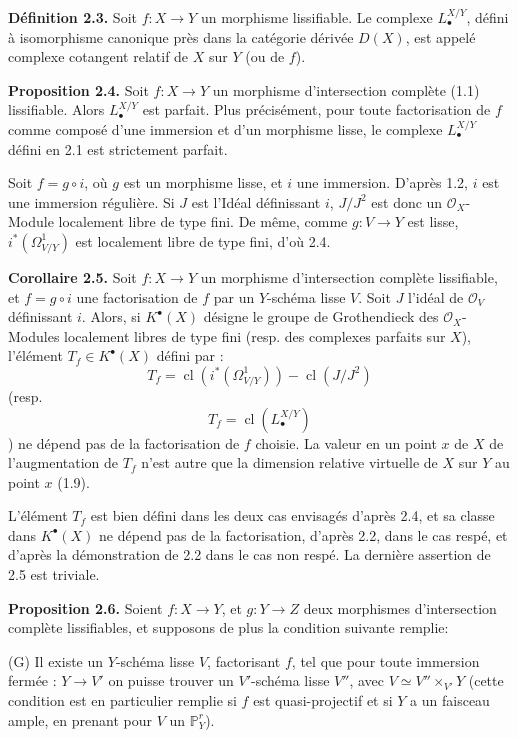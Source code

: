 \documentclass[11pt]{article}
\begin{document}
\textbf{Définition 2.3.} Soit $f:X\to Y$ un morphisme lissifiable. Le complexe $L^{X/Y}_\bullet$, défini à isomorphisme canonique près dans la catégorie dérivée $D(X)$, est appelé complexe cotangent relatif de $X$ sur $Y$ (ou de $f$).

\textbf{Proposition 2.4.} Soit $f:X\to Y$ un morphisme d'intersection complète (1.1) lissifiable. Alors $L^{X/Y}_\bullet$ est parfait. Plus précisément, pour toute
factorisation de $f$ comme composé d'une immersion et d'un morphisme lisse, le complexe $L^{X/Y}_\bullet$ défini en 2.1 est strictement parfait.

Soit $f=g\circ i$, où $g$ est un morphisme lisse, et $i$ une immersion. D'après 1.2, $i$ est une immersion régulière. Si $J$ est l'Idéal définissant $i$, $J/J^2$ est donc un $\mathcal O_X$-Module localement libre de type fini. De même, comme $g:V\to Y$ est lisse, $i^*(\Omega^1_{V/Y})$ est localement libre de type fini, d'où 2.4.

\textbf{Corollaire 2.5.} Soit $f:X\to Y$ un morphisme d'intersection complète lissifiable, et $f=g\circ i$ une factorisation de $f$ par un $Y$-schéma lisse $V$. Soit $J$ l'idéal de $\mathcal O_V$ définissant $i$. Alors, si $K^{\bullet}(X)$ désigne le groupe de Grothendieck des $\mathcal O_X$-Modules localement libres de type fini (resp. des complexes parfaits sur $X$), l'élément $T_f\in K^{\bullet}(X)$ défini par :
\[
T_f=\operatorname{cl}(i^*(\Omega^1_{V/Y}))-\operatorname{cl}(J/J^2)
\]
(resp.
\[
T_f=\operatorname{cl}(L^{X/Y}_\bullet)
\]
)
ne dépend pas de la factorisation de $f$ choisie. La valeur en un point $x$ de $X$ de l'augmentation de $T_f$ n'est autre que la dimension relative virtuelle de $X$ sur $Y$ au point $x$ (1.9).

L'élément $T_f$ est bien défini dans les deux cas envisagés d'après 2.4, et sa classe dans $K^{\bullet}(X)$ ne dépend pas de la factorisation, d'après 2.2, dans le cas respé, et d'après la démonstration de 2.2 dans le cas non respé. La dernière assertion de 2.5 est triviale.

\textbf{Proposition 2.6.} Soient $f:X\to Y$, et $g:Y\to Z$ deux morphismes d'intersection complète lissifiables, et supposons de plus la condition suivante remplie:

(G) Il
existe un $Y$-schéma lisse $V$, factorisant $f$, tel que pour toute immersion fermée : $Y\to V'$ on puisse trouver un $V'$-schéma lisse $V''$, avec $V\simeq V''\times_{V'}Y$ (cette condition est en particulier remplie si $f$ est quasi-projectif et si $Y$ a un faisceau ample, en prenant pour $V$ un $\mathbb P^r_Y$).
\end{document}
